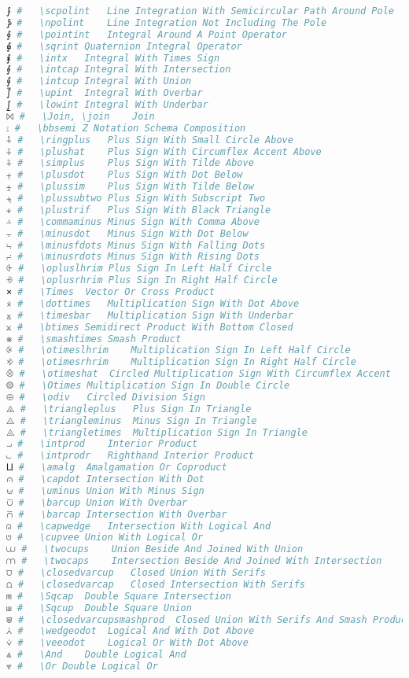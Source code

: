 \begin{lstlisting}[language=Julia, style=julia, linewidth=\textwidth]
⨓ #   \scpolint   Line Integration With Semicircular Path Around Pole
⨔ #   \npolint    Line Integration Not Including The Pole
⨕ #   \pointint   Integral Around A Point Operator
⨖ #   \sqrint Quaternion Integral Operator
⨘ #   \intx   Integral With Times Sign
⨙ #   \intcap Integral With Intersection
⨚ #   \intcup Integral With Union
⨛ #   \upint  Integral With Overbar
⨜ #   \lowint Integral With Underbar
⨝ #   \Join, \join    Join
⨟ #   \bbsemi Z Notation Schema Composition
⨢ #   \ringplus   Plus Sign With Small Circle Above
⨣ #   \plushat    Plus Sign With Circumflex Accent Above
⨤ #   \simplus    Plus Sign With Tilde Above
⨥ #   \plusdot    Plus Sign With Dot Below
⨦ #   \plussim    Plus Sign With Tilde Below
⨧ #   \plussubtwo Plus Sign With Subscript Two
⨨ #   \plustrif   Plus Sign With Black Triangle
⨩ #   \commaminus Minus Sign With Comma Above
⨪ #   \minusdot   Minus Sign With Dot Below
⨫ #   \minusfdots Minus Sign With Falling Dots
⨬ #   \minusrdots Minus Sign With Rising Dots
⨭ #   \opluslhrim Plus Sign In Left Half Circle
⨮ #   \oplusrhrim Plus Sign In Right Half Circle
⨯ #   \Times  Vector Or Cross Product
⨰ #   \dottimes   Multiplication Sign With Dot Above
⨱ #   \timesbar   Multiplication Sign With Underbar
⨲ #   \btimes Semidirect Product With Bottom Closed
⨳ #   \smashtimes Smash Product
⨴ #   \otimeslhrim    Multiplication Sign In Left Half Circle
⨵ #   \otimesrhrim    Multiplication Sign In Right Half Circle
⨶ #   \otimeshat  Circled Multiplication Sign With Circumflex Accent
⨷ #   \Otimes Multiplication Sign In Double Circle
⨸ #   \odiv   Circled Division Sign
⨹ #   \triangleplus   Plus Sign In Triangle
⨺ #   \triangleminus  Minus Sign In Triangle
⨻ #   \triangletimes  Multiplication Sign In Triangle
⨼ #   \intprod    Interior Product
⨽ #   \intprodr   Righthand Interior Product
⨿ #   \amalg  Amalgamation Or Coproduct
⩀ #   \capdot Intersection With Dot
⩁ #   \uminus Union With Minus Sign
⩂ #   \barcup Union With Overbar
⩃ #   \barcap Intersection With Overbar
⩄ #   \capwedge   Intersection With Logical And
⩅ #   \cupvee Union With Logical Or
⩊ #   \twocups    Union Beside And Joined With Union
⩋ #   \twocaps    Intersection Beside And Joined With Intersection
⩌ #   \closedvarcup   Closed Union With Serifs
⩍ #   \closedvarcap   Closed Intersection With Serifs
⩎ #   \Sqcap  Double Square Intersection
⩏ #   \Sqcup  Double Square Union
⩐ #   \closedvarcupsmashprod  Closed Union With Serifs And Smash Product
⩑ #   \wedgeodot  Logical And With Dot Above
⩒ #   \veeodot    Logical Or With Dot Above
⩓ #   \And    Double Logical And
⩔ #   \Or Double Logical Or

\end{lstlisting}
